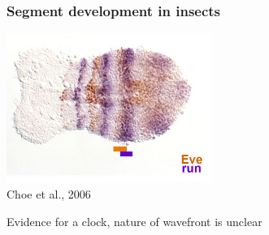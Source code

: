 \documentclass[compress]{beamer}
\begin{document}
\begin{frame}
    \frametitle{Segment development in insects}
   \begin{center}
     \includegraphics[width=0.5\textwidth]{figures/tribolium_eve_run.jpg}\\

    {\small Choe et al., 2006}
    \end{center}
    Evidence for a clock, nature of wavefront is unclear
\end{frame}
\end{document}
